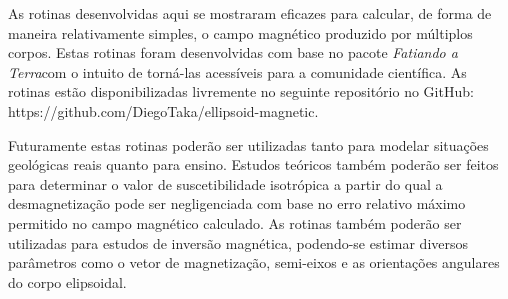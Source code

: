 As rotinas desenvolvidas aqui se mostraram eficazes para calcular, de forma de maneira relativamente simples, o campo magnético produzido por múltiplos corpos. Estas rotinas foram desenvolvidas com base no pacote \textit{Fatiando a Terra}com o intuito de torná-las acessíveis para a comunidade científica. As rotinas estão disponibilizadas livremente no seguinte repositório no GitHub: https://github.com/DiegoTaka/ellipsoid-magnetic.

Futuramente estas rotinas poderão ser utilizadas tanto para modelar situações geológicas reais quanto para ensino. Estudos teóricos também poderão ser feitos para determinar o valor de suscetibilidade isotrópica a partir do qual a desmagnetização pode ser negligenciada com base no erro relativo máximo permitido no campo magnético calculado. As rotinas também poderão ser utilizadas para estudos de inversão magnética, podendo-se estimar diversos parâmetros como o vetor de magnetização, semi-eixos e as orientações angulares do corpo elipsoidal.

